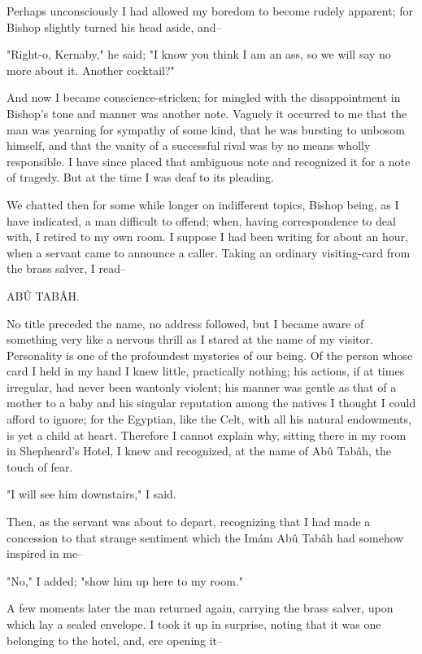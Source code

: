 Perhaps unconsciously I had allowed my boredom to become rudely
apparent; for Bishop slightly turned his head aside, and--

"Right-o, Kernaby," he said; "I know you think I am an ass, so we
will say no more about it. Another cocktail?"

And now I became conscience-stricken; for mingled with the
disappointment in Bishop's tone and manner was another note. Vaguely
it occurred to me that the man was yearning for sympathy of some kind,
that he was bursting to unbosom himself, and that the vanity of a
successful rival was by no means wholly responsible. I have since
placed that ambiguous note and recognized it for a note of tragedy.
But at the time I was deaf to its pleading.

We chatted then for some while longer on indifferent topics, Bishop
being, as I have indicated, a man difficult to offend; when, having
correspondence to deal with, I retired to my own room. I suppose I
had been writing for about an hour, when a servant came to announce
a caller. Taking an ordinary visiting-card from the brass salver,
I read--

     ABÛ TABÂH.

No title preceded the name, no address followed, but I became aware of
something very like a nervous thrill as I stared at the name of my
visitor. Personality is one of the profoundest mysteries of our being.
Of the person whose card I held in my hand I knew little, practically
nothing; his actions, if at times irregular, had never been wantonly
violent; his manner was gentle as that of a mother to a baby and his
singular reputation among the natives I thought I could afford to
ignore; for the Egyptian, like the Celt, with all his natural
endowments, is yet a child at heart. Therefore I cannot explain why,
sitting there in my room in Shepheard's Hotel, I knew and recognized,
at the name of Abû Tabâh, the touch of fear.

"I will see him downstairs," I said.

Then, as the servant was about to depart, recognizing that I had made
a concession to that strange sentiment which the Imám Abû Tabâh had
somehow inspired in me--

"No," I added; "show him up here to my room."

A few moments later the man returned again, carrying the brass salver,
upon which lay a sealed envelope. I took it up in surprise, noting
that it was one belonging to the hotel, and, ere opening it--

